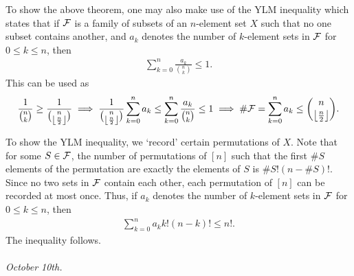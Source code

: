 To show the above theorem, one may also make use of the YLM inequality which states that if $\mathcal{F}$ is a family of subsets of an $n$-element set $X$ such that no one subset contains another, and $a_{k}$ denotes the number of $k$-element sets in $\mathcal{F}$ for $0 \leq k \leq n$, then
\begin{align}
    \sum_{k=0}^{n} \frac{a_{k}}{\binom{n}{k}} \leq 1.
\end{align}
This can be used as
\begin{align}
    \frac{1}{\binom{n}{k}} \geq \frac{1}{\binom{n}{\left\lfloor \frac{n}{2} \right\rfloor}} \implies \frac{1}{\binom{n}{\left\lfloor \frac{n}{2} \right\rfloor}}\sum_{k=0}^{n} a_{k} \leq \sum_{k=0}^{n} \frac{a_{k}}{\binom{n}{k}} \leq 1 \implies \# \mathcal{F} = \sum_{k=0}^{n} a_{k} \leq \binom{n}{\left\lfloor \frac{n}{2} \right\rfloor}.
\end{align}

To show the YLM inequality, we `record' certain permutations of $X$. Note that for some $S \in \mathcal{F}$, the number of permutations of $[n]$ such that the first $\# S$ elements of the permutation are exactly the elements of $S$ is $\# S! (n-\#S)!$. Since no two sets in $\mathcal{F}$ contain each other, each permutation of $[n]$ can be recorded at most once. Thus, if $a_{k}$ denotes the number of $k$-element sets in $\mathcal{F}$ for $0 \leq k \leq n$, then
\begin{align}
    \sum_{k=0}^{n} a_{k} k!(n-k)! \leq n!.
\end{align}
The inequality follows.\\ \\
\textit{October 10th.}

